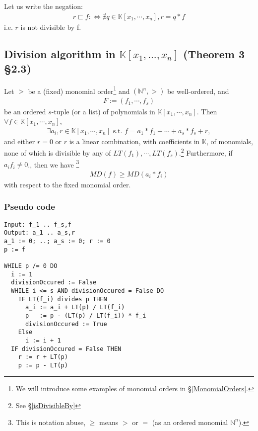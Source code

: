 \documentclass[11pt]{book}
\begin{document}
Let us write the negation:
\begin{eqnarray}
r \sqsubset f :\Leftrightarrow \nexists q \in \mathbb{K}[x_1, \cdots, x_n], r = q*f
\end{eqnarray}
i.e. $r$ is not divisible by f.

\subsection{Division algorithm in $\mathbb{K}[x_1, ... , x_n]$ (Theorem 3 \S2.3)}
\label{DivisionAlgorithmInN}
Let $>$ be a (fixed) monomial order\footnote{We will introduce some examples of monomial orders in \S\ref{MonomialOrders}.} and $(\mathbb{N}^n, >)$ be well-ordered, and
\begin{eqnarray}
F := (f_1, \cdots, f_s)
\end{eqnarray}
be an ordered $s$-tuple (or a list) of polynomials in $\mathbb{K}[x_1, \cdots, x_n]$.
Then $\forall f \in \mathbb{K}[x_1, \cdots, x_n]$,
\begin{eqnarray}
\exists a_i, r  \in \mathbb{K}[x_1, \cdots, x_n] \text{ s.t. } f = a_1*f_1 + \cdots + a_s * f_s + r,
\end{eqnarray}
and either $r=0$ or $r$ is a linear combination, with coefficients in $\mathbb{K}$, of monomials, none of which is divisible by any of $LT(f_1), \cdots, LT(f_s)$.\footnote{See \S\ref{isDivisibleBy}}
Furthermore, if $a_i f_i \neq 0$., then we have \footnote{This is notation abuse, $\geq$ means $>$ or $=$ (as an ordered monomial $\mathbb{N}^n$).}
\begin{eqnarray}
\label{decreasingMultiDegree}
MD(f) \geq MD(a_i * f_i)
\end{eqnarray}
with respect to the fixed monomial order.

\newpage
\subsubsection{Pseudo code}
\begin{verbatim}
Input: f_1 .. f_s,f
Output: a_1 .. a_s,r
a_1 := 0; ..; a_s := 0; r := 0
p := f

WHILE p /= 0 DO
  i := 1
  divisionOccured := False
  WHILE i <= s AND divisionOccured = False DO
    IF LT(f_i) divides p THEN
      a_i := a_i + LT(p) / LT(f_i)
      p   := p - (LT(p) / LT(f_i)) * f_i
      divisionOccured := True
    Else
      i := i + 1
  IF divisionOccured = False THEN
    r := r + LT(p)
    p := p - LT(p)
\end{verbatim}
\end{document}

